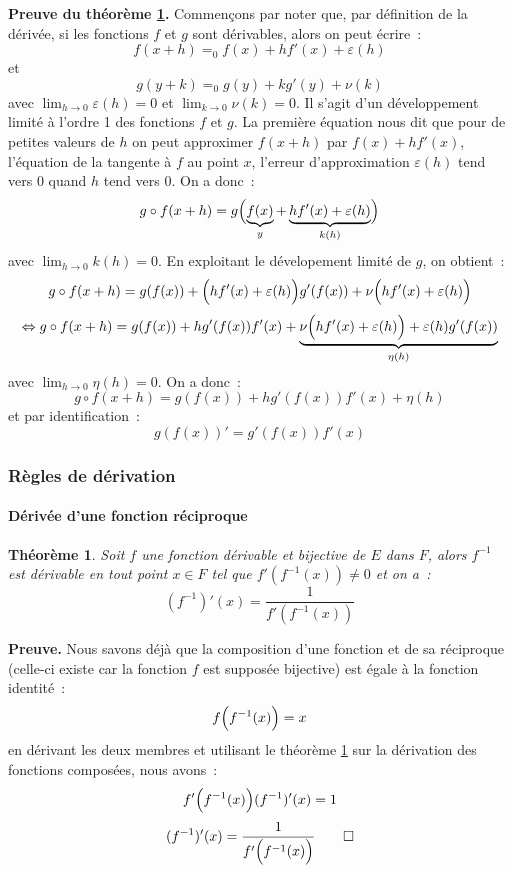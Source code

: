 \documentclass[10pt,notheorems]{beamer}
\theoremstyle{plain}
\newtheorem{theorem}{Théorème}
\theoremstyle{definition} %
\begin{document}
\begin{notes}
  \textbf{Preuve du théorème \hyperlink{slide_derivee_composition_1}{\ref{thm:composition}}.} Commençons par noter que, par définition de la dérivée, si les fonctions $f$ et $g$ sont dérivables, alors on peut écrire~:
  \[
    f(x+h) =_0 f(x) + hf'(x) + \varepsilon(h)
  \]
  et
  \[
    g(y+k) =_0 g(y) + kg'(y) + \nu(k)
  \]
  avec $\lim_{h\rightarrow 0}\varepsilon(h)=0$ et $\lim_{k\rightarrow 0}\nu(k)=0$. Il s'agit d'un développement limité à l'ordre 1 des fonctions $f$ et $g$. La première équation nous dit que pour de petites valeurs de $h$ on peut approximer $f(x+h)$ par $f(x) + hf'(x)$, l'équation de la tangente à $f$ au point $x$, l'erreur d'approximation $\varepsilon(h)$ tend vers 0 quand $h$ tend vers 0. On a donc~:
  \[
    g\circ f(x+h) = g\Bigl(\underbrace{f(x)}_{y}+\underbrace{hf'(x) + \varepsilon(h)}_{k(h)}\Bigr)
  \]
  avec $\lim_{h\rightarrow 0}k(h) = 0$. En exploitant le dévelopement limité de $g$, on obtient~:
  \[
    g\circ f(x+h) = g(f(x)) + \Bigl( hf'(x) + \varepsilon(h) \Bigr) g'(f(x)) + \nu\Bigl( hf'(x) + \varepsilon(h) \Bigr)
  \]
  \[
    \Leftrightarrow g\circ f(x+h) = g(f(x)) + h g'(f(x))f'(x) + \underbrace{\nu\Bigl( hf'(x) + \varepsilon(h) \Bigr)+\varepsilon(h)g'(f(x))}_{\eta(h)}
  \]
  avec $\lim_{h\rightarrow 0}\eta(h) = 0$. On a donc~:
  \[
    g\circ f(x+h) = g(f(x)) + h g'(f(x))f'(x) + \eta(h)
  \]
  et par identification~:
  \[
    g(f(x))' = g'(f(x))f'(x)
  \]

\end{notes}


\begin{frame}
  \frametitle{Règles de dérivation}
  \framesubtitle{Dérivée d'une fonction réciproque}
  \hypertarget{slide_derivee_reciproque_1}{}

  \begin{theorem}\label{thm:composition}
    Soit $f$ une fonction dérivable et bijective de $E$ dans $F$, alors $f^{-1}$ est dérivable en tout point $x\in F$ tel que $f'(f^{-1}(x))\neq 0$ et on a~:
    \[
      (f^{-1})'(x) = \frac{1}{f'(f^{-1}(x))}
    \]
  \end{theorem}

  \bigskip

  {\small \textbf{Preuve.} Nous savons déjà que la composition d'une fonction et de sa réciproque (celle-ci existe car la fonction $f$ est supposée bijective) est égale à la fonction identité~:
    \[
      f\Bigl(f^{-1}(x)\Bigr) = x
    \]
    en dérivant les deux membres et utilisant le théorème \hyperlink{slide_derivee_composition_1}{\ref{thm:composition}} sur la dérivation des fonctions composées, nous avons~:
    \[
      f'\Bigl(f^{-1}(x)\Bigr)(f^{-1})'(x)  = 1
    \]
    \[
      (f^{-1})'(x)  = \frac{1}{f'\Bigl(f^{-1}(x)\Bigr)}\qed
    \]
  }

\end{frame}
\end{document}
